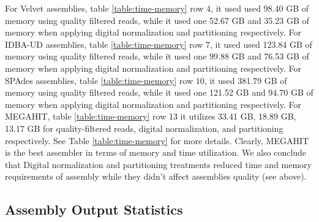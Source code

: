 For Velvet assemblies, table \ref{table:time-memory} row 4, it used used 98.40 GB of memory using quality
filtered reads, while it used one 52.67 GB and 35.23 GB of memory when
applying digital normalization and partitioning respectively. For IDBA-UD
assemblies, table \ref{table:time-memory} row 7, it used used 123.84 GB of memory using quality filtered
reads, while it used one 99.88 GB and 76.53 GB of memory when applying
digital normalization and partitioning respectively. For SPAdes
assemblies, table \ref{table:time-memory} row 10, it used 381.79 GB of memory using quality filtered reads,
while it used one 121.52 GB and 94.70 GB of memory when applying
digital normalization and partitioning respectively.  For MEGAHIT, table \ref{table:time-memory} row 13 it
utilizes 33.41 GB, 18.89 GB, 13.17 GB for quality-filtered reads,
digital normalization, and partitioning respectively. See Table
\ref{table:time-memory} for more details. Clearly, MEGAHIT is the
best assembler in terms of memory and time utilization. We also
conclude that Digital normalization and partitioning treatments
reduced time and memory requirements of assembly while they didn't
affect assemblies quality (see above).

 



\subsection*{Assembly Output Statistics}

